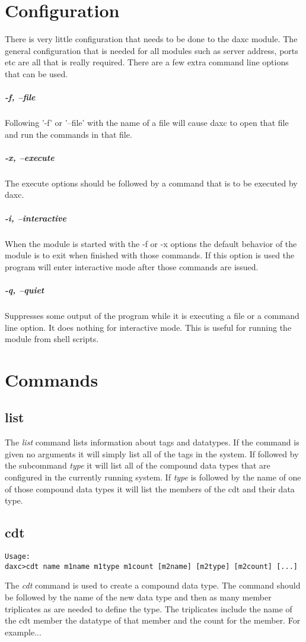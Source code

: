 \section{Configuration}
There is very little configuration that needs to be done to the daxc module.  The general configuration that is needed for all modules such as server address, ports etc are all that is really required.  There are a few extra command line options that can be used.

\subparagraph*{-f, --file}
Following '-f' or '--file' with the name of a file will cause daxc to open that file and run the commands in that file.

\subparagraph*{-x, --execute}
The execute options should be followed by a command that is to be executed by daxc.

\subparagraph*{-i, --interactive}
When the module is started with the -f or -x options the default behavior of the module is to exit when finished with those commands.  If this option is used the program will enter interactive mode after those commands are issued.

\subparagraph*{-q, --quiet}
Suppresses some output of the program while it is executing a file or a command line option.  It does nothing for interactive mode.  This is useful for running the module from shell scripts. 

\section{Commands}

\subsection{list}
The \textit{list} command lists information about tags and datatypes.  If the command is given no arguments it will simply list all of the tags in the system.  If followed by the subcommand \textit{type} it will list all of the compound data types that are configured in the currently running system.  If \textit{type} is followed by the name of one of those compound data types it will list the members of the cdt and their data type.

\subsection{cdt}
\begin{verbatim}
Usage:
daxc>cdt name m1name m1type m1count [m2name] [m2type] [m2count] [...]
\end{verbatim}
The \textit{cdt} command is used to create a compound data type.  The command should be followed by the name of the new data type and then as many member triplicates as are needed to define the type.  The triplicates include the name of the cdt member the datatype of that member and the count for the member.  For example...

